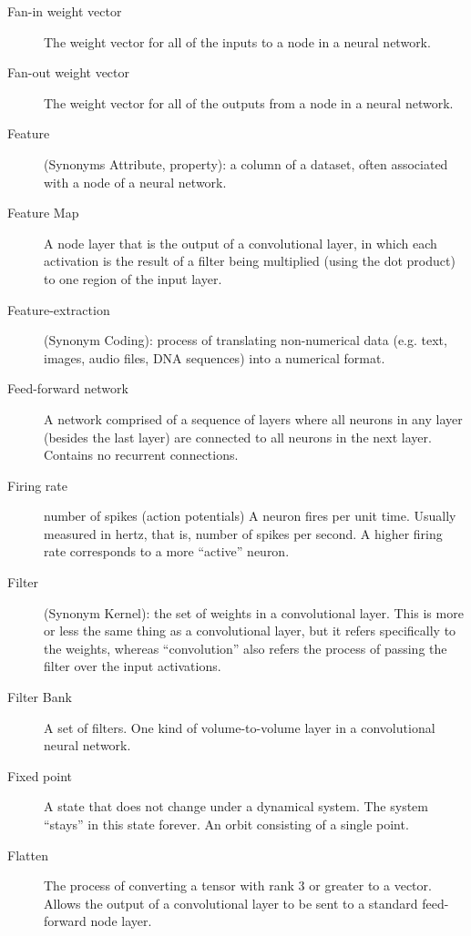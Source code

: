 \begin{description}
\item[Fan-in weight vector] The weight vector for all of the inputs to a node in a neural network.

\item[Fan-out weight vector] The weight vector for all of the outputs from a node in a neural network.

\item[Feature] (Synonyms Attribute, property): a column of a dataset, often associated with a node of a neural network.

\item[Feature Map] A node layer that is the output of a convolutional layer, in which each activation is the result of a filter being multiplied (using the dot product) to one region of the input layer.

\item[Feature-extraction] (Synonym Coding):  process of translating non-numerical data (e.g. text, images, audio files, DNA sequences) into a numerical format. %

\item[Feed-forward network] A network comprised of a sequence of layers where all neurons in any layer (besides the last layer) are connected to all neurons in the next layer. Contains no recurrent connections.

\item[Firing rate] number of spikes (action potentials) A neuron fires per unit time. Usually measured in hertz, that is, number of spikes per second. A higher firing rate corresponds to a more ``active'' neuron. 

\item[Filter] (Synonym Kernel): the set of weights in a convolutional layer. This is more or less the same thing as a convolutional layer, but it refers specifically to the weights, whereas ``convolution'' also refers the process of passing the filter over the input activations.

\item[Filter Bank] A set of filters. One kind of volume-to-volume layer in a convolutional neural network. 

\item[Fixed point] A state that does not change under a dynamical system. The system ``stays'' in this state forever. An orbit consisting of a single point.

\item[Flatten] The process of converting a tensor with rank 3 or greater to a vector.  Allows the output of a convolutional layer to be sent to a standard feed-forward node layer.


\end{description}
